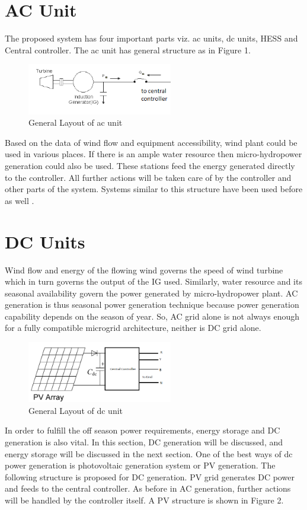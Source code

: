 \documentclass[journal,twoside]{IEEEtran}
\begin{document}
\section{AC Unit}
The proposed system has four important parts viz. ac units, dc units, HESS and Central controller. The ac unit has general structure as in Figure 1.
\begin{figure}[!ht]
\centering
\includegraphics[width=2.5in]{1}
\caption{General Layout of ac unit}
\end{figure}
Based on the data of wind flow and equipment accessibility, wind plant could be used in various places. If there is an ample water resource then micro-hydropower generation could also be used. These stations feed the energy generated directly to the controller. All further actions will be taken care of by the controller and other parts of the system. Systems similar to this structure have been used before as well \cite{Piagi2006, Liu2015, Jabri2015, Moghadam2015}.

\section{DC Units}
Wind flow and energy of the flowing wind governs the speed of wind turbine which in turn governs the output of the IG used. Similarly, water resource and its seasonal availability govern the power generated by micro-hydropower plant. AC generation is thus seasonal power generation technique because power generation capability depends on the season of year. So, AC grid alone is not always enough for a fully compatible microgrid architecture, neither is DC grid alone. 
\begin{figure}[!t]
\centering
\includegraphics[width=2.5in]{2}
\caption{General Layout of dc unit}
\label{f2}
\end{figure}In order to fulfill the off season power requirements, energy storage and DC generation is also vital. In this section, DC generation will be discussed, and energy storage will be discussed in the next section. One of the best ways of dc power generation is photovoltaic generation system or PV generation. The following structure is proposed for DC generation. PV grid generates DC power and feeds to the central controller. As before in AC generation, further actions will be handled by the controller itself. A PV structure is shown in Figure 2.
\end{document}
